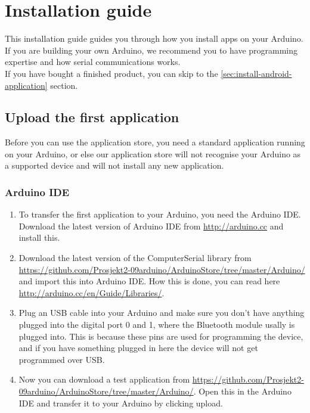 \chapter{Installation guide}
This installation guide guides you through how you install apps on your Arduino. If you are building your own Arduino, we recommend you to have programming expertise and how serial communications works.\\

If you have bought a finished product, you can skip to the \ref{sec:install-android-application} section.

	\section{Upload the first application}
	Before you can use the application store, you need a standard application running on your Arduino, or else our application store will not recognise your Arduino as a supported device and will not install any new application.
	
		\subsection{Arduino IDE}
		\begin{enumerate}
		\item To transfer the first application to your Arduino, you need the Arduino IDE. Download the latest version of Arduino IDE from \url{http://arduino.cc} and install this.
	
		\item Download the latest version of the ComputerSerial library from \url{https://github.com/Prosjekt2-09arduino/ArduinoStore/tree/master/Arduino/} and import this into Arduino IDE. How this is done, you can read here \url{http://arduino.cc/en/Guide/Libraries/}.
	
		\item Plug an USB cable into your Arduino and make sure you don't have anything plugged into the digital port 0 and 1, where the Bluetooth module usally is plugged into. This is because these pins are used for programming the device, and if you have something plugged in here the device will not get programmed over USB.
		
		\item Now you can download a test application from \url{https://github.com/Prosjekt2-09arduino/ArduinoStore/tree/master/Arduino/}. Open this in the Arduino IDE and transfer it to your Arduino by clicking upload.
		\end{enumerate}
		
